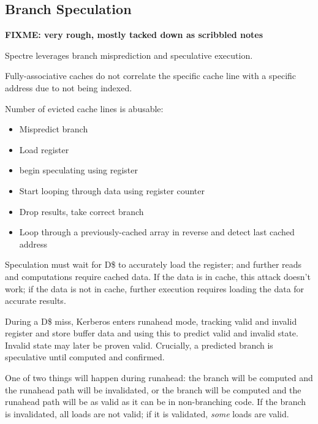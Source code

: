 \subsection{Branch Speculation}

{\bf FIXME:  very rough, mostly tacked down as scribbled notes}

Spectre leverages branch misprediction and speculative execution.

Fully-associative caches do not correlate the specific cache line with a
specific address due to not being indexed.

Number of evicted cache lines is abusable:

\begin{itemize}

    \item Mispredict branch

    \item Load register

    \item begin speculating using register

    \item Start looping through data using register counter

    \item Drop results, take correct branch

    \item Loop through a previously-cached array in reverse and detect last
        cached address

\end{itemize}

Speculation must wait for D\$ to accurately load the register; and further
reads and computations require cached data.  If the data is in cache, this
attack doesn't work; if the data is not in cache, further execution requires
loading the data for accurate results.

During a D\$ miss, Kerberos enters runahead mode, tracking valid and invalid
register and store buffer data and using this to predict valid and invalid
state.  Invalid state may later be proven valid.  Crucially, a predicted branch
is speculative until computed and confirmed.

One of two things will happen during runahead:  the branch will be computed and
the runahead path will be invalidated, or the branch will be computed and the
runahead path will be as valid as it can be in non-branching code.  If the
branch is invalidated, all loads are not valid; if it is validated, {\em some}
loads are valid.

